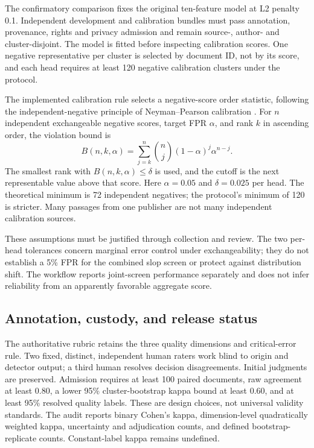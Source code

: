 The confirmatory comparison fixes the original ten-feature model at L2 penalty
0.1. Independent development and calibration bundles must pass annotation,
provenance, rights and privacy admission and remain source-, author- and
cluster-disjoint. The model is fitted before inspecting calibration scores.
One negative representative per cluster is selected by document ID, not by its
score, and each head requires at least 120 negative calibration clusters under
the protocol.

The implemented calibration rule selects a negative-score order statistic,
following the independent-negative principle of Neyman--Pearson calibration
\cite{tong2018}. For $n$ independent exchangeable negative scores, target FPR
$\alpha$, and rank $k$ in ascending order, the violation bound is
\begin{equation}
 B(n,k,\alpha)=\sum_{j=k}^{n}\binom{n}{j}
                  (1-\alpha)^j\alpha^{n-j}.
\end{equation}
The smallest rank with $B(n,k,\alpha)\leq\delta$ is used, and the cutoff is
the next representable value above that score. Here $\alpha=0.05$ and
$\delta=0.025$ per head. The theoretical minimum is 72 independent negatives;
the protocol's minimum of 120 is stricter. Many passages from one publisher
are not many independent calibration sources.

These assumptions must be justified through collection and review. The
two per-head tolerances concern marginal error control under exchangeability;
they do not establish a 5\% FPR for the combined slop screen or protect against
distribution shift. The workflow reports joint-screen performance separately
and does not infer reliability from an apparently favorable aggregate score.

\subsection{Annotation, custody, and release status}
The authoritative rubric retains the three quality dimensions and critical-error
rule. Two fixed, distinct, independent human raters work blind to origin and
detector output; a third human resolves decision disagreements. Initial
judgments are preserved. Admission requires at least 100 paired documents,
raw agreement at least 0.80, a lower 95\% cluster-bootstrap kappa bound at
least 0.60, and at least 95\% resolved quality labels. These are design choices,
not universal validity standards. The audit reports binary Cohen's kappa,
dimension-level quadratically weighted kappa, uncertainty and adjudication
counts, and defined bootstrap-replicate counts. Constant-label kappa remains
undefined.

